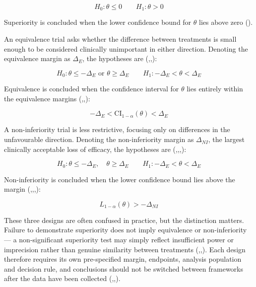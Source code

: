\documentclass{article}
\begin{document}
\[H_0: \theta \leq 0 \qquad H_1: \theta > 0\]

Superiority is concluded when the lower confidence bound for \(\theta\)
lies above zero ().

An equivalence trial asks whether the difference between treatments is
small enough to be considered clinically unimportant in either
direction. Denoting the equivalence margin as \(\Delta_E\), the
hypotheses are
(,,):

\[H_0: \theta \leq -\Delta_E \text{ or } \theta \geq \Delta_E \qquad H_1: -\Delta_E < \theta < \Delta_E\]

Equivalence is concluded when the confidence interval for \(\theta\)
lies entirely within the equivalence margins
(,,):

\[-\Delta_E < \text{CI}_{1-\alpha}(\theta) < \Delta_E\]

A non-inferiority trial is less restrictive, focusing only on
differences in the unfavourable direction. Denoting the non-inferiority
margin as \(\Delta_{NI}\), the largest clinically acceptable loss of
efficacy, the hypotheses are
(,,,):

\[H_0: \theta \leq -\Delta_E, \quad \theta \geq \Delta_E \qquad H_1: -\Delta_E < \theta < \Delta_E\]

Non-inferiority is concluded when the lower confidence bound lies above
the margin
(,,,):

\[L_{1-\alpha}(\theta) > -\Delta_{NI}\]

These three designs are often confused in practice, but the distinction
matters. Failure to demonstrate superiority does not imply equivalence
or non-inferiority --- a non-significant superiority test may simply
reflect insufficient power or imprecision rather than genuine similarity
between treatments
(,,).
Each design therefore requires its own pre-specified margin, endpoints,
analysis population and decision rule, and conclusions should not be
switched between frameworks after the data have been collected
(,,).
\end{document}
